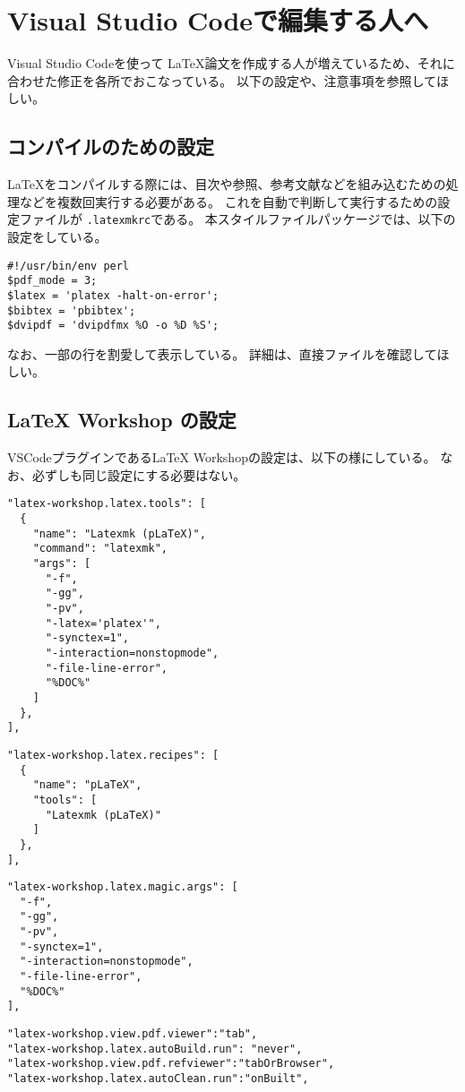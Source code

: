 \documentclass[a4paper,10pt,twocolumn]{jsarticle}
\begin{document}
\section{Visual Studio Codeで編集する人へ}
Visual Studio Codeを使って \LaTeX 論文を作成する人が増えているため、それに合わせた修正を各所でおこなっている。
以下の設定や、注意事項を参照してほしい。

\subsection{コンパイルのための設定}
\LaTeX をコンパイルする際には、目次や参照、参考文献などを組み込むための処理などを複数回実行する必要がある。
これを自動で判断して実行するための設定ファイルが \verb+.latexmkrc+である。
本スタイルファイルパッケージでは、以下の設定をしている。
\begin{screen}
{\small
\begin{verbatim}
#!/usr/bin/env perl
$pdf_mode = 3;
$latex = 'platex -halt-on-error';
$bibtex = 'pbibtex';
$dvipdf = 'dvipdfmx %O -o %D %S';
\end{verbatim}    
}
\end{screen}

なお、一部の行を割愛して表示している。
詳細は、直接ファイルを確認してほしい。

\subsection{LaTeX Workshop の設定}
VSCodeプラグインであるLaTeX Workshopの設定は、以下の様にしている。
なお、必ずしも同じ設定にする必要はない。
\begin{screen}
{\footnotesize
\begin{verbatim}
"latex-workshop.latex.tools": [
  {
    "name": "Latexmk (pLaTeX)",
    "command": "latexmk",
    "args": [
      "-f",
      "-gg",
      "-pv",
      "-latex='platex'",
      "-synctex=1",
      "-interaction=nonstopmode",
      "-file-line-error",
      "%DOC%"
    ]
  },
],
\end{verbatim}
}
\end{screen}
\begin{screen}
    {\footnotesize
    \begin{verbatim}
"latex-workshop.latex.recipes": [
  {
    "name": "pLaTeX",
    "tools": [
      "Latexmk (pLaTeX)"
    ]
  },
],
\end{verbatim}
}
\end{screen}
\begin{screen}
{\footnotesize
\begin{verbatim}
"latex-workshop.latex.magic.args": [
  "-f",
  "-gg",
  "-pv",
  "-synctex=1",
  "-interaction=nonstopmode",
  "-file-line-error",
  "%DOC%"
],
\end{verbatim}
}
\end{screen}
\begin{screen}
{\footnotesize
\begin{verbatim}
"latex-workshop.view.pdf.viewer":"tab",
"latex-workshop.latex.autoBuild.run": "never",
"latex-workshop.view.pdf.refviewer":"tabOrBrowser",
"latex-workshop.latex.autoClean.run":"onBuilt",
\end{verbatim}
}
\end{screen}
\end{document}
